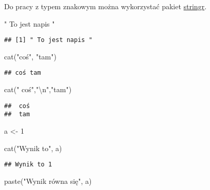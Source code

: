 \documentclass[
]{book}
\newenvironment{Shaded}{\begin{snugshade}}{\end{snugshade}}
\newcommand{\DecValTok}[1]{\textcolor[rgb]{0.00,0.00,0.81}{#1}}
\newcommand{\FunctionTok}[1]{\textcolor[rgb]{0.00,0.00,0.00}{#1}}
\newcommand{\NormalTok}[1]{#1}
\newcommand{\OtherTok}[1]{\textcolor[rgb]{0.56,0.35,0.01}{#1}}
\newcommand{\SpecialCharTok}[1]{\textcolor[rgb]{0.00,0.00,0.00}{#1}}
\newcommand{\StringTok}[1]{\textcolor[rgb]{0.31,0.60,0.02}{#1}}
\begin{document}
Do pracy z typem znakowym można wykorzystać pakiet \href{https://stringr.tidyverse.org/}{stringr}.

\begin{Shaded}
\begin{Highlighting}[]
\StringTok{" To jest napis "}
\end{Highlighting}
\end{Shaded}

\begin{verbatim}
## [1] " To jest napis "
\end{verbatim}

\begin{Shaded}
\begin{Highlighting}[]
\FunctionTok{cat}\NormalTok{(}\StringTok{"coś"}\NormalTok{, }\StringTok{"tam"}\NormalTok{)}
\end{Highlighting}
\end{Shaded}

\begin{verbatim}
## coś tam
\end{verbatim}

\begin{Shaded}
\begin{Highlighting}[]
\FunctionTok{cat}\NormalTok{(}\StringTok{" coś"}\NormalTok{,}\StringTok{"}\SpecialCharTok{\textbackslash{}n}\StringTok{"}\NormalTok{,}\StringTok{"tam"}\NormalTok{)}
\end{Highlighting}
\end{Shaded}

\begin{verbatim}
##  coś 
##  tam
\end{verbatim}

\begin{Shaded}
\begin{Highlighting}[]
\NormalTok{a }\OtherTok{\textless{}{-}} \DecValTok{1}

\FunctionTok{cat}\NormalTok{(}\StringTok{"Wynik to"}\NormalTok{, a)}
\end{Highlighting}
\end{Shaded}

\begin{verbatim}
## Wynik to 1
\end{verbatim}

\begin{Shaded}
\begin{Highlighting}[]
\FunctionTok{paste}\NormalTok{(}\StringTok{"Wynik równa się"}\NormalTok{, a)}
\end{Highlighting}
\end{Shaded}
\end{document}
